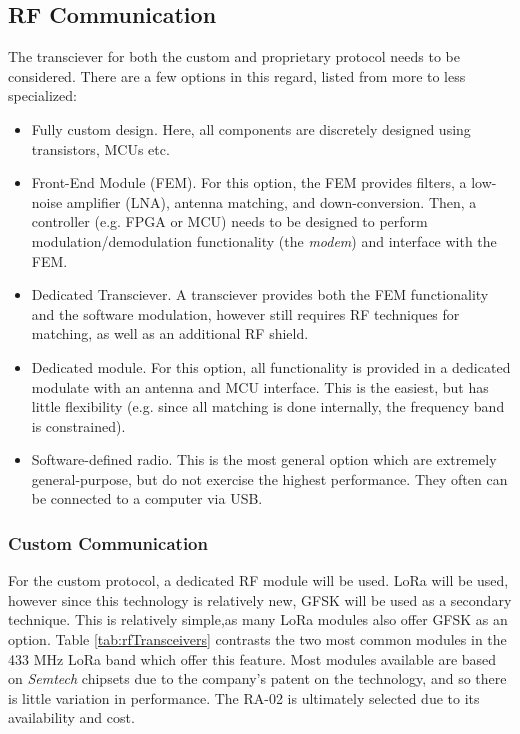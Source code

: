 \subsection{RF Communication}
The transciever for both the custom and proprietary protocol needs to be considered. There are a few options in this regard, listed from more to less specialized:
\begin{itemize}
    \item Fully custom design. Here, all components are discretely designed using transistors, MCUs etc.
    \item Front-End Module (FEM). For this option, the FEM provides filters, a low-noise amplifier (LNA), antenna matching, and down-conversion. Then, a controller (e.g. FPGA or MCU) needs to be designed to perform modulation/demodulation functionality (the \textit{modem}) and interface with the FEM.
    \item Dedicated Transciever. A transciever provides both the FEM functionality and the software modulation, however still requires RF techniques for matching, as well as an additional RF shield.
    \item Dedicated module. For this option, all functionality is provided in a dedicated modulate with an antenna and MCU interface. This is the easiest, but has little flexibility (e.g. since all matching is done internally, the frequency band is constrained).
    \item Software-defined radio. This is the most general option which are extremely general-purpose, but do not exercise the highest performance. They often can be connected to a computer via USB.
\end{itemize}

\subsubsection{Custom Communication}
For the custom protocol, a dedicated RF module will be used. LoRa will be used, however since this technology is relatively new, GFSK will be used as a secondary technique. This is relatively simple,as many LoRa modules also offer GFSK as an option. Table \ref{tab:rfTransceivers} contrasts the two most common modules in the 433 MHz LoRa band which offer this feature. Most modules available are based on \textit{Semtech} chipsets due to the company's patent on the technology, and so there is little variation in performance. The RA-02 is ultimately selected due to its availability and cost.

